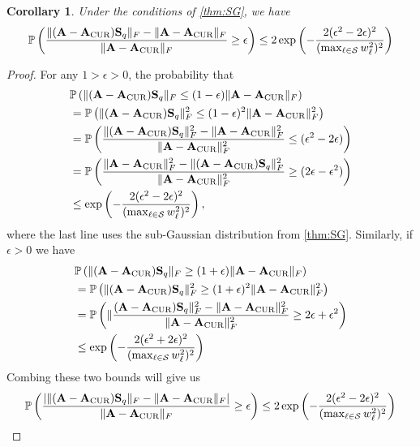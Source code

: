 \documentclass[11pt]{article}
\newcommand{\curX}{\mathbf{A}_{\textup{CUR}}}
\newtheorem{corollary}{Corollary}
\begin{document}
\begin{corollary}
    Under the conditions of \cref{thm:SG},  we have
    \begin{equation}
        \mathbb{P}\left( \frac{\|(\mathbf{A} - \curX)\mathbf{S}_q\|_F -\|\mathbf{A} - \curX\|_F}{\|\mathbf{A} - \curX\|_F} \geq \epsilon \right) \leq 2 \exp \left(-\frac{2(\epsilon^2 - 2\epsilon)^2 }{(\max_{\ell\in\mathcal{S}}w_{\ell}^2)^2} \right)
    \end{equation}
\end{corollary}
\begin{proof}
    For any $1>\epsilon >0$, the probability that
    \begin{align}
         & \mathbb{P}\left( \|(\mathbf{A} - \curX)\mathbf{S}_q\|_F \leq (1-\epsilon) \|\mathbf{A} - \curX\|_F \right)                                                         \\
         & =  \mathbb{P}\left( \|(\mathbf{A} - \curX)\mathbf{S}_q\|_F^2 \leq (1-\epsilon)^2 \|\mathbf{A} - \curX\|_F^2 \right)                                                \\
         & =  \mathbb{P}\left( \frac{\|(\mathbf{A} - \curX)\mathbf{S}_q\|_F^2 - \|\mathbf{A} - \curX\|_F^2}{\|\mathbf{A} - \curX\|_F^2 } \leq (\epsilon^2 - 2\epsilon)\right) \\
         & =  \mathbb{P}\left( \frac{\|\mathbf{A} - \curX\|_F^2 - \|(\mathbf{A} - \curX)\mathbf{S}_q\|_F^2}{\|\mathbf{A} - \curX\|_F^2} \geq (2\epsilon - \epsilon^2) \right) \\
         & \leq \exp \left(-\frac{2(\epsilon^2 - 2\epsilon)^2 }{(\max_{\ell\in\mathcal{S}}w_{\ell}^2)^2} \right),
    \end{align}
    where the last line uses the sub-Gaussian distribution from \cref{thm:SG}. Similarly, if $\epsilon > 0$ we have
    \begin{align}
         & \mathbb{P}\left( \|(\mathbf{A} - \curX)\mathbf{S}_q\|_F \geq (1+\epsilon) \|\mathbf{A} - \curX\|_F \right)                                                    \\
         & = \mathbb{P}\left( \|(\mathbf{A} - \curX)\mathbf{S}_q\|_F^2 \geq (1+\epsilon)^2 \|\mathbf{A} - \curX\|_F^2 \right)                                            \\
         & =\mathbb{P}\left( \|\frac{(\mathbf{A} - \curX)\mathbf{S}_q\|_F^2 - \|\mathbf{A} - \curX\|_F^2}{\|\mathbf{A} - \curX\|_F^2} \geq 2\epsilon +\epsilon^2 \right) \\
         & \leq \exp \left(-\frac{2(\epsilon^2 + 2\epsilon)^2 }{(\max_{\ell\in\mathcal{S}}w_{\ell}^2)^2} \right)
    \end{align}
    Combing these two bounds will give us
    \begin{equation}
        \mathbb{P}\left( \frac{|\|(\mathbf{A} - \curX)\mathbf{S}_q\|_F - \|\mathbf{A} - \curX\|_F  |}{ \|\mathbf{A} - \curX\|_F }\geq \epsilon \right) \leq 2 \exp \left(-\frac{2(\epsilon^2 - 2\epsilon)^2}{(\max_{\ell\in\mathcal{S}}w_{\ell}^2)^2} \right)
    \end{equation}
\end{proof}
\end{document}
